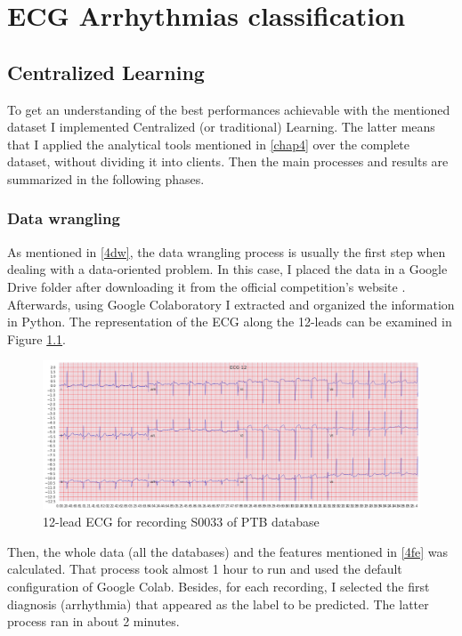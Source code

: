 \chapter{ECG Arrhythmias classification} \label{chap5}

\section{Centralized Learning} \label{5CL}

To get an understanding of the best performances achievable with the mentioned dataset I implemented Centralized (or traditional) Learning. The latter means that I applied the analytical tools mentioned in \ref{chap4} over the complete dataset, without dividing it into clients. Then the main processes and results are summarized in the following phases.

\subsection{Data wrangling}

As mentioned in \ref{4dw}, the data wrangling process is usually the first step when dealing with a data-oriented problem. In this case, I placed the data in a Google Drive folder after downloading it from the official competition's website \cite{dataset3}. Afterwards, using Google Colaboratory I extracted and organized the information in Python. The representation of the ECG along the 12-leads can be examined in Figure \ref{fig:ecg_example_S0033}.

\begin{figure}[H]
\centering
\includegraphics[scale=0.32]{img/ecg_example_S0033.png}
\caption{12-lead ECG for recording S0033 of PTB database}
\label{fig:ecg_example_S0033}
\end{figure}

Then, the whole data (all the databases) and the features mentioned in \ref{4fe} was calculated. That process took almost 1 hour to run and used the default configuration of Google Colab. Besides, for each recording, I selected the first diagnosis (arrhythmia) that appeared as the label to be predicted. The latter process ran in about 2 minutes.

